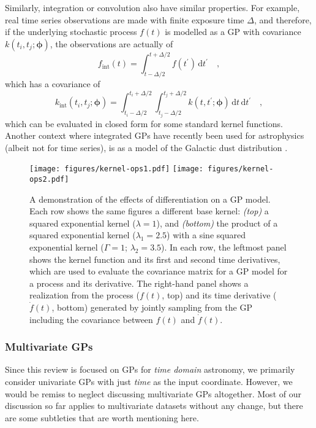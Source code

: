 \documentclass[letterpaper]{ar-1col}
\newcommand{\hyperparams}{\ensuremath{\boldsymbol{\phi}}}
\newcommand{\lengthscale}{\ensuremath{\lambda}}
\begin{document}
Similarly, integration or convolution also have similar properties.
For example, real time series observations are made with finite exposure time $\Delta$, and therefore, if the underlying stochastic process $f(t)$ is modelled as a GP with covariance $k(t_i,t_j;\hyperparams)$, the observations are actually of
\begin{equation}
  f_\mathrm{int}(t) = \int_{t-\Delta/2}^{t+\Delta/2} f(t^\prime)\,\mathrm{d}t^\prime \quad,
\end{equation}
which has a covariance of
\begin{equation}
  k_\mathrm{int}(t_i,t_j;\hyperparams) = \int_{t_i-\Delta/2}^{t_i+\Delta/2}\int_{t_j-\Delta/2}^{t_j+\Delta/2} k(t,t^\prime;\hyperparams)\,\mathrm{d}t\,\mathrm{d}t^\prime \quad,
\end{equation}
which can be evaluated in closed form for some standard kernel functions.
Another context where integrated GPs have recently been used for astrophysics (albeit not for time series), is as a model of the Galactic dust distribution \citep{2022arXiv220206797M}.

\begin{figure}[ht]
  \centering
  \texttt{[image: figures/kernel-ops1.pdf]}
  \texttt{[image: figures/kernel-ops2.pdf]}
  \caption{A demonstration of the effects of differentiation on a GP model.
  Each row shows the same figures a different base kernel: \emph{(top)} a squared exponential kernel ($\lengthscale = 1$), and \emph{(bottom)} the product of a squared exponential kernel ($\lengthscale_1 = 2.5$) with a sine squared exponential kernel ($\Gamma = 1$; $\lengthscale_2 = 3.5$).
  In each row, the leftmost panel shows the kernel function and its first and second time derivatives, which are used to evaluate the covariance matrix for a GP model for a process and its derivative.
  The right-hand panel shows a realization from the process ($f(t)$, top) and its time derivative ($\dot{f}(t)$, bottom) generated by jointly sampling from the GP including the covariance between $f(t)$ and $\dot{f}(t)$.}
  \label{fig:kernel-ops}
\end{figure}


\subsubsection{Multivariate GPs}

Since this review is focused on GPs for \emph{time domain} astronomy, we primarily consider univariate GPs with just \emph{time} as the input coordinate.
However, we would be remiss to neglect discussing multivariate GPs altogether.
Most of our discussion so far applies to multivariate datasets without any change, but there are some subtleties that are worth mentioning here.
\end{document}
